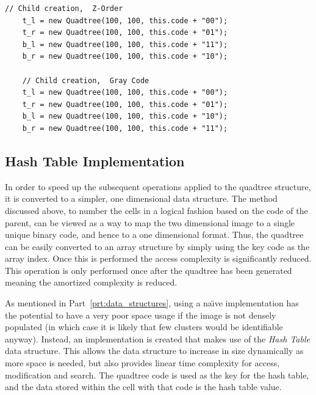 \begin{center}
\begin{minipage}{\textwidth}
\begin{lstlisting}[caption={[Code to generate the children of the current
	quadtree using Z- and Gray ordering.]Code to generate children of the
	current quadtree while maintaining the correct ordering. Z- and Gray
	ordering.}, label=code:child_construction]
	// Child creation,  Z-Order
	t_l = new Quadtree(100, 100, this.code + "00");
	t_r = new Quadtree(100, 100, this.code + "01");
	b_l = new Quadtree(100, 100, this.code + "11");
	b_r = new Quadtree(100, 100, this.code + "10");

	// Child creation,  Gray Code
	t_l = new Quadtree(100, 100, this.code + "00");
	t_r = new Quadtree(100, 100, this.code + "01");
	b_l = new Quadtree(100, 100, this.code + "10");
	b_r = new Quadtree(100, 100, this.code + "11");
\end{lstlisting}
\end{minipage}
\end{center}

\subsection{Hash Table Implementation}
\label{sub:hash_table_implementation}

In order to speed up the subsequent operations applied to the quadtree
structure, it is converted to a simpler, one dimensional data structure. The
method discussed above, to number the cells in a logical fashion based on the
code of the parent, can be viewed as a way to map the two dimensional image to
a single unique binary code, and hence to a one dimensional format. Thus, the
quadtree can be easily converted to an array structure by simply using the key
code as the array index. Once this is performed the access complexity is
significantly reduced. This operation is only performed once after the quadtree
has been generated meaning the amortized complexity is reduced.

As mentioned in Part~\ref{prt:data_structures}, using a na\"{\i}ve
implementation has the potential to have a very poor space usage if the image
is not densely populated (in which case it is likely that few clusters would be
identifiable anyway). Instead, an implementation is created that makes use of
the \emph{Hash Table} data structure\cite{cormen2001introduction}. This allows
the data structure to increase in size dynamically as more space is needed, but
also provides linear time complexity for access, modification and search. The
quadtree code is used as the key for the hash table, and the data stored within
the cell with that code is the hash table value.

